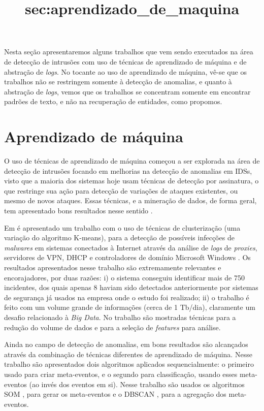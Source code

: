 \documentclass[
	12pt,				%
	openright,			%
	twoside,			%
	a4paper,			%
	english,			%
	french,				%
	spanish,			%
	brazil,				%
	]{abntex2}
\begin{document}
Nesta seção apresentaremos alguns trabalhos que vem sendo executados na área de detecção de intrusões com uso de técnicas de aprendizado de máquina e de abstração de \emph{logs}. No tocante ao uso de aprendizado de máquina, vê-se que os trabalhos não se restringem somente à detecção de anomalias, e quanto à abstração de \emph{logs}, vemos que os trabalhos se concentram somente em encontrar padrões de texto, e não na recuperação de entidades, como propomos.

\section{Aprendizado de máquina}\title{sec:aprendizado_de_maquina}
O uso de técnicas de aprendizado de máquina começou a ser explorada na área de detecção de intrusões focando em melhorias na detecção de anomalias em IDSs, visto que a maioria dos sistemas hoje usam técnicas de detecção por assinatura, o que restringe sua ação para detecção de variações de ataques existentes, ou mesmo de novos ataques. Essas técnicas, e a mineração de dados, de forma geral, tem apresentado bons resultados nesse sentido \cite{dua2011data, yen2013beehive, zomlot2013aiding, ganapathy2012intelligent, li2013automatic, joseph2012machine}.

Em \cite{yen2013beehive} é apresentado um trabalho com o uso de técnicas de clusterização (uma variação do algoritmo K-means\cite{ball1967clustering}), para a detecção de possíveis infecções de \emph{malwares} em sistemas conectados à Internet através da análise de \emph{logs} de \emph{proxies}, servidores de VPN, DHCP e controladores de domínio Microsoft Windows \texttrademark. Os resultados apresentados nesse trabalho são extremamente relevantes e encorajadores, por duas razões: i) o sistema conseguiu identificar mais de 750 incidentes, dos quais apenas 8 haviam sido detectados anteriormente por sistemas de segurança já usados na empresa onde o estudo foi realizado; ii) o trabalho é feito com um volume grande de informações (cerca de 1 Tb/dia), claramente um desafio relacionado à \emph{Big Data}. No trabalho são mostradas técnicas para a redução do volume de dados e para a seleção de \emph{features} para análise.

Ainda no campo de detecção de anomalias, em \cite{li2013automatic} bons resultados são alcançados através da combinação de técnicas diferentes de aprendizado de máquina. Nesse trabalho são apresentados dois algoritmos aplicados sequencialmente: o primeiro usado para criar meta-eventos, e o segundo para classificação, usando esses meta-eventos (ao invés dos eventos em si). Nesse trabalho são usados os algoritmos SOM \cite{kohonen1989self}, para gerar os meta-eventos e o DBSCAN \cite{ester1996density}, para a agregação dos meta-eventos.
\end{document}
